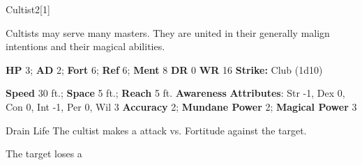   \begin{monsection}{Cultist}{2}[1]
    \vspace{-1em}\vspace{-1em}
    \vspace{0em}

    
      Cultists may serve many masters.
      They are united in their generally malign intentions and their magical abilities.
    

    \begin{spellcontent}
      \begin{spelltargetinginfo}
        \pari \textbf{HP} 3;
          \textbf{AD} 2;
          \textbf{Fort} 6;
          \textbf{Ref} 6;
          \textbf{Ment} 8
        \pari \textbf{DR} 0
        \pari \textbf{WR} 16
        \pari \textbf{Strike:}
            Club  (1d10)
      \end{spelltargetinginfo}
    \end{spellcontent}
    \begin{monsterfooter}
      \pari \textbf{Speed} 30 ft.;
        \textbf{Space} 5 ft.;
        \textbf{Reach} 5 ft.
      \pari \textbf{Awareness} 
      \pari \textbf{Attributes}:
        Str -1, Dex 0,
        Con 0, Int -1,
        Per 0, Wil 3
      \pari \textbf{Accuracy} 2;
        \textbf{Mundane Power} 2;
      \textbf{Magical Power} 3
    \end{monsterfooter}
  \end{monsection}
  \begin{freeability}{Drain Life}
       The cultist makes a  attack
        vs. Fortitude against the target.
    
    \hit The target loses a 
    \end{freeability}
  
